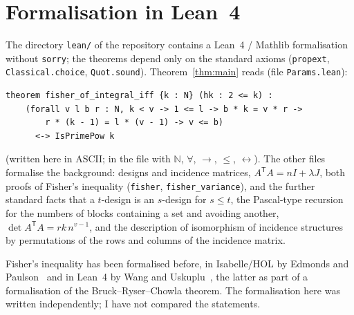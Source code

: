 \documentclass[11pt,a4paper]{article}
\theoremstyle{definition}
\begin{document}
\section{Formalisation in Lean~4}\label{sec:lean}
The directory \texttt{lean/} of the repository contains a Lean~4 / Mathlib formalisation without \texttt{sorry}; the theorems depend only on the standard axioms (\texttt{propext}, \texttt{Classical.choice}, \texttt{Quot.sound}).
Theorem~\ref{thm:main} reads (file \texttt{Params.lean}):
\begin{verbatim}
theorem fisher_of_integral_iff {k : N} (hk : 2 <= k) :
    (forall v l b r : N, k < v -> 1 <= l -> b * k = v * r ->
        r * (k - 1) = l * (v - 1) -> v <= b)
      <-> IsPrimePow k
\end{verbatim}
(written here in ASCII; in the file with $\mathbb N$, $\forall$, $\to$, $\le$, $\leftrightarrow$).
The other files formalise the background: designs and incidence matrices, $A^{\mathsf T}A=nI+\lambda J$, both proofs of Fisher's inequality (\texttt{fisher}, \texttt{fisher\_variance}), and the further standard facts that a $t$-design is an $s$-design for $s\le t$, the Pascal-type recursion for the numbers of blocks containing a set and avoiding another, $\det A^{\mathsf T}A=rk\,n^{v-1}$, and the description of isomorphism of incidence structures by permutations of the rows and columns of the incidence matrix.

Fisher's inequality has been formalised before, in Isabelle/HOL by Edmonds and Paulson~\cite{edmonds2022} and in Lean~4 by Wang and Uskuplu~\cite{wang2026}, the latter as part of a formalisation of the Bruck--Ryser--Chowla theorem.
The formalisation here was written independently; I have not compared the statements.
\end{document}

